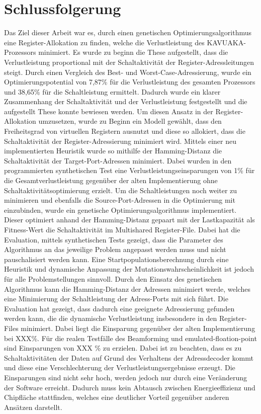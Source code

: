 \chapter{Schlussfolgerung}
\label{chap:schlussfolgerung}
Das Ziel dieser Arbeit war es, durch einen genetischen Optimierungsalgorithmus eine Register-Allokation zu finden, welche die Verlustleistung des KAVUAKA-Prozessors minimiert. Es wurde zu beginn die These aufgestellt, dass die Verlustleistung proportional mit der Schaltaktivität der Register-Adressleitungen steigt. Durch einen Vergleich des Best- und Worst-Case-Adressierung, wurde ein Optimierungspotential von 7,87\% für die Verlustleistung des gesamten Prozessors und 38,65\% für die Schaltleistung ermittelt. Dadurch wurde ein klarer Zusammenhang der Schaltaktivität und der Verlustleistung festgestellt und die aufgestellt These konnte bewiesen werden. Um diesen Ansatz in der Register-Allokation umzusetzen, wurde zu Beginn ein Modell gewählt, dass den Freiheitsgrad von virtuellen Registern ausnutzt und diese so allokiert, dass die Schaltaktivität der Register-Adressierung minimiert wird. Mittels einer neu implementierten Heuristik wurde so mithilfe der Hamming-Distanz die Schaltaktivität der Target-Port-Adressen minimiert. Dabei wurden in den programmierten synthetischen Test eine Verlustleistungseinsparungen von 1\% für die Gesamtverlustleistung gegenüber der alten Implementierung ohne Schaltaktivitätsoptimierung erzielt.
Um die Schaltleistungen noch weiter zu minimieren und ebenfalls die Source-Port-Adressen in die Optimierung mit einzubinden, wurde ein genetische Optimierungsalgorithmus implementiert. Dieser optimiert anhand der Hamming-Distanz gepaart mit der Lastkapazität als Fitness-Wert die Schaltaktivität im Multishared Register-File. Dabei hat die Evaluation, mittels synthetischen Tests gezeigt, dass die Parameter des Algorithmus an das jeweilige Problem angepasst werden muss und nicht pauschalisiert werden kann. Eine Startpopulationsberechnung durch eine Heuristik und dynamische Anpassung der Mutationswahrscheinlichkeit ist jedoch für alle Problemstellungen sinnvoll.
Durch den Einsatz des genetischen Algorithmus kann die Hamming-Distanz der Adressen minimiert werde, welches eine Minimierung der Schaltleistung der Adress-Ports mit sich führt.  
Die Evaluation hat gezeigt, dass dadurch eine geeignete Adressierung gefunden werden kann, die die dynamische Verlustleistung insbesondere in den Register-Files minimiert. Dabei liegt die Einsparung gegenüber der alten Implementierung bei XXX\%. Für die realen Testfälle des Beamforming und emulated-floation-point sind Einsparungen von XXX \% zu erzielen. Dabei ist zu beachten, dass es zu Schaltaktivitäten der Daten auf Grund des Verhaltens der Adressdecoder kommt und diese eine Verschlechterung der Verlustleistungsergebnisse erzeugt. Die Einsparungen sind nicht sehr hoch, werden jedoch nur durch eine Veränderung der Software erreicht. Dadurch muss kein Abtausch zwischen Energieeffizienz und Chipfläche stattfinden, welches eine deutlicher Vorteil gegenüber anderen Ansätzen darstellt.
